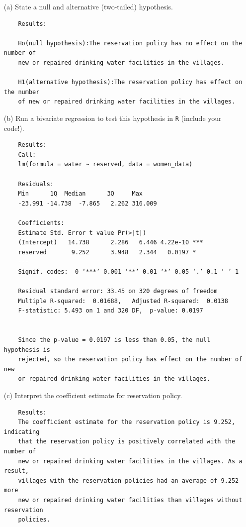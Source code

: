 \documentclass[12pt,letterpaper]{article}
\begin{document}
\newpage
\begin{enumerate}
	\item [(a)] State a null and alternative (two-tailed) hypothesis. 
	
	\begin{verbatim} 
	Results: 
	
	Ho(null hypothesis):The reservation policy has no effect on the number of 
	new or repaired drinking water facilities in the villages.
	
	H1(alternative hypothesis):The reservation policy has effect on the number 
	of new or repaired drinking water facilities in the villages.
	\end{verbatim}		
	
	\vspace{1cm}
	\item [(b)] Run a bivariate regression to test this hypothesis in \texttt{R} (include your code!).
	
	
	
	\begin{verbatim} 
	Results: 
	Call:
	lm(formula = water ~ reserved, data = women_data)
	
	Residuals:
	Min      1Q  Median      3Q     Max 
	-23.991 -14.738  -7.865   2.262 316.009 
	
	Coefficients:
	Estimate Std. Error t value Pr(>|t|)    
	(Intercept)   14.738      2.286   6.446 4.22e-10 ***
	reserved       9.252      3.948   2.344   0.0197 *  
	---
	Signif. codes:  0 ‘***’ 0.001 ‘**’ 0.01 ‘*’ 0.05 ‘.’ 0.1 ‘ ’ 1
	
	Residual standard error: 33.45 on 320 degrees of freedom
	Multiple R-squared:  0.01688,	Adjusted R-squared:  0.0138 
	F-statistic: 5.493 on 1 and 320 DF,  p-value: 0.0197
	
	
	Since the p-value = 0.0197 is less than 0.05, the null hypothesis is 
	rejected, so the reservation policy has effect on the number of new 
	or repaired drinking water facilities in the villages.
	\end{verbatim}		
	
	\vspace{1cm}
	\item [(c)] Interpret the coefficient estimate for reservation policy. 
	
	\begin{verbatim} 
	Results: 
	The coefficient estimate for the reservation policy is 9.252, indicating 
	that the reservation policy is positively correlated with the number of 
	new or repaired drinking water facilities in the villages. As a result, 
	villages with the reservation policies had an average of 9.252 more 
	new or repaired drinking water facilities than villages without reservation 
	policies.
	\end{verbatim}		
	
\end{enumerate}
\end{document}
